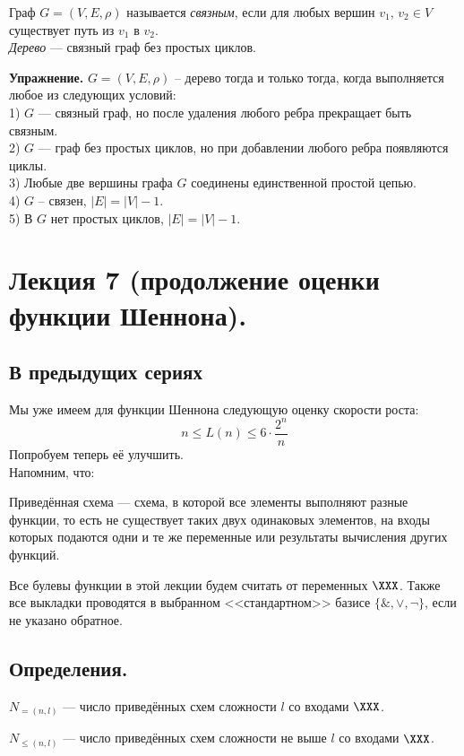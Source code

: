 \begin{df}
Граф $G = (V, E, \rho)$ называется \textit{связным}, если для любых вершин $v_1,\,v_2\in V$ существует путь из $v_1$ в $v_2$.\\
\textit{Дерево} --- связный граф без простых циклов.
\end{df}

\textbf{Упражнение.} $G = (V, E, \rho)$ -- дерево тогда и только тогда, когда выполняется любое из следующих условий:\\
1) $G$ --- связный граф, но после удаления любого ребра прекращает быть связным.\\
2) $G$ --- граф без простых циклов, но при добавлении любого ребра появляются циклы.\\
3) Любые две вершины графа $G$ соединены единственной простой цепью.\\
4) $G$ -- связен, $|E| = |V| - 1$.\\
5) В $G$ нет простых циклов, $|E| = |V| - 1$.


\section{Лекция 7 (продолжение оценки функции Шеннона).} 
\subsection{В предыдущих сериях}
Мы уже имеем для функции Шеннона следующую оценку скорости роста:
$$n\leq L(n)\leq 6\cdot \frac{2^n}{n}$$
Попробуем теперь её улучшить.\\
Напомним, что:
\begin{df}
Приведённая схема --- схема, в которой все элементы выполняют разные функции, то есть не существует таких двух одинаковых элементов, на входы которых подаются одни и те же переменные или результаты вычисления других функций.
\end{df}
Все булевы функции в этой лекции будем считать от переменных $\XXX$. Также все выкладки проводятся в выбранном <<стандартном>> базисе $\{\& ,\vee ,\neg\}$, если не указано обратное.
\subsection{Определения.}
\begin{df}
$N_{=(n,l)}$ --- число приведённых схем сложности $l$ со входами $\XXX$.
\end{df}
\begin{df}
$N_{\leq(n,l)}$ --- число приведённых схем сложности не выше $l$ со входами $\XXX$.
\end{df}

